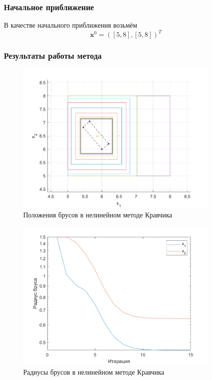 \subsubsection{Начальное приближение}
В качестве начального приближения возьмём
\begin{equation}
    \textbf{x}^0=([5, 8],[5, 8])^T
\end{equation}
\newpage
\subsubsection{Результаты работы метода}
\begin{figure}[H]
\centering
\includegraphics[width=0.9\textwidth]{Graphics/NonLinear_boxes.png}
\caption{Положения брусов в нелинейном методе Кравчика} 
\end{figure}
\begin{figure}[H]
\centering
\includegraphics[width=0.9\textwidth]{Graphics/NonLinear_bar_rad.png}
\caption{Радиусы брусов в нелинейном методе Кравчика} 
\end{figure}
